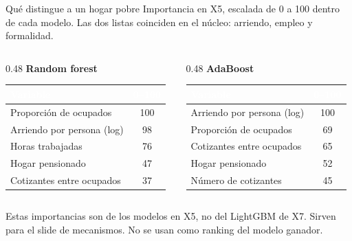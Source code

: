 \documentclass[aspectratio=169,10pt]{beamer}
\newcommand{\mejor}{\rowcolor{uniandesYellow}}
\newcommand{\fila}{\rowcolor{rowAlt}}
\newcommand{\hh}[1]{\cellcolor{uniandesInk}\textcolor{white}{\textbf{#1}}}
\begin{document}
\begin{frame}{Qué distingue a un hogar pobre}
  Importancia en X5, escalada de 0 a 100 dentro de cada modelo. Las dos listas coinciden en el núcleo: arriendo, empleo y formalidad.
  \vspace{0.4em}
  \footnotesize
  \begin{columns}[T,onlytextwidth]
    \begin{column}{0.48\textwidth}
      \centering
      \textbf{Random forest}\\[0.3em]
      \begin{tabular}{@{}lc@{}}
        \toprule
        \hh{Variable} & \hh{0--100} \\
        \midrule
        \mejor Proporción de ocupados & 100 \\
        Arriendo por persona (log) & 98 \\
        \fila Horas trabajadas & 76 \\
        Hogar pensionado & 47 \\
        Cotizantes entre ocupados & 37 \\
        \bottomrule
      \end{tabular}
    \end{column}
    \begin{column}{0.48\textwidth}
      \centering
      \textbf{AdaBoost}\\[0.3em]
      \begin{tabular}{@{}lc@{}}
        \toprule
        \hh{Variable} & \hh{0--100} \\
        \midrule
        \mejor Arriendo por persona (log) & 100 \\
        Proporción de ocupados & 69 \\
        \fila Cotizantes entre ocupados & 65 \\
        Hogar pensionado & 52 \\
        Número de cotizantes & 45 \\
        \bottomrule
      \end{tabular}
    \end{column}
  \end{columns}
  \vspace{0.55em}
  \scriptsize Estas importancias son de los modelos en X5, no del LightGBM de X7. Sirven para el slide de mecanismos. No se usan como ranking del modelo ganador.
\end{frame}
\end{document}
